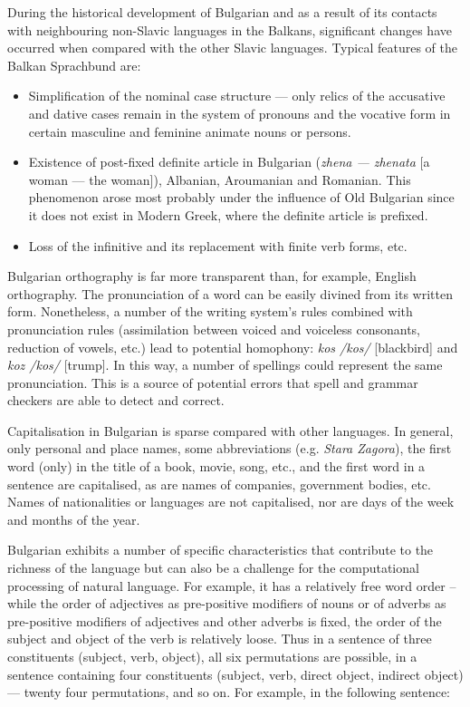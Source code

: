 \documentclass[]{../../metanetpaper}
\begin{document}
\begin{multicols}{2}
During the historical development of Bulgarian and as a result of its contacts with neighbouring non-Slavic languages in the Balkans, significant changes have occurred when compared with the other Slavic languages. Typical features of the Balkan Sprachbund are:
\begin{itemize}
\item Simplification of the nominal case structure — only relics of the accusative and dative cases remain in the system of pronouns and the vocative form in certain masculine and feminine animate nouns or persons.

\item Existence of post-fixed definite article in Bulgarian (\textit{{zhena — zhenata}} [a woman — the woman]), Albanian, Aroumanian and Romanian. This phenomenon arose most probably under the influence of Old Bulgarian since it does not exist in Modern Greek, where the definite article is prefixed.

\item Loss of the infinitive and its replacement with finite verb forms, etc. 
\end{itemize}

Bulgarian orthography is far more transparent than, for example, English orthography. The pronunciation of a word can be easily divined from its written form. Nonetheless, a number of the writing system's rules combined with pronunciation rules (assimilation between voiced and voiceless consonants, reduction of vowels, etc.) lead to potential homophony: \textit{{kos} /kos/} [blackbird] and \textit{{koz /kos/}} [trump]. In this way, a number of spellings could represent the same pronunciation. This is a source of potential errors that spell and grammar checkers are able to detect and correct.

Capitalisation in Bulgarian is sparse compared with other languages. In general, only personal and place names, some abbreviations (e.g. \textit{Stara Zagora}), the first word (only) in the title of a book, movie, song, etc., and the first word in a sentence are capitalised, as are names of companies, government bodies, etc. Names of nationalities or languages are not capitalised, nor are days of the week and months of the year.
 
Bulgarian exhibits a number of specific characteristics that contribute to the richness of the language but can also be a challenge for the computational processing of natural language. For example, it has a relatively free word order – while the order of adjectives as pre-positive modifiers of nouns or of adverbs as pre-positive modifiers of adjectives and other adverbs is fixed, the order of the subject and object of the verb is relatively loose. Thus in a sentence of three constituents (subject, verb, object), all six permutations are possible, in a sentence containing four constituents (subject, verb, direct object, indirect object) — twenty four permutations, and so on. For example, in the following sentence:


\end{multicols}
\end{document}
